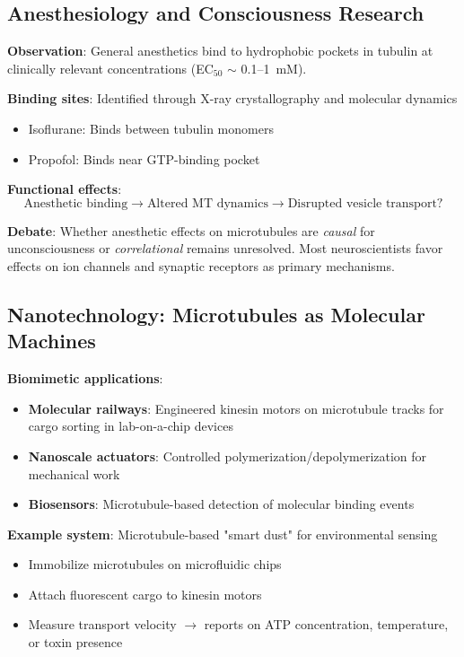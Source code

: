 \subsection{Anesthesiology and Consciousness Research}
\label{subsec:anesthesia}

\textbf{Observation}: General anesthetics bind to hydrophobic pockets in tubulin at clinically relevant concentrations (EC$_{50}$ $\sim$ 0.1--1~mM).

\textbf{Binding sites}: Identified through X-ray crystallography and molecular dynamics
\begin{itemize}
\item Isoflurane: Binds between tubulin monomers
\item Propofol: Binds near GTP-binding pocket
\end{itemize}

\textbf{Functional effects}:
\begin{equation}
\text{Anesthetic binding} \rightarrow \text{Altered MT dynamics} \rightarrow \text{Disrupted vesicle transport?}
\label{eq:anesthetic-cascade}
\end{equation}

\begin{warningbox}
\textbf{Debate}: Whether anesthetic effects on microtubules are \textit{causal} for unconsciousness or \textit{correlational} remains unresolved. Most neuroscientists favor effects on ion channels and synaptic receptors as primary mechanisms.
\end{warningbox}

\subsection{Nanotechnology: Microtubules as Molecular Machines}
\label{subsec:nanotech}

\textbf{Biomimetic applications}:
\begin{itemize}
\item \textbf{Molecular railways}: Engineered kinesin motors on microtubule tracks for cargo sorting in lab-on-a-chip devices
\item \textbf{Nanoscale actuators}: Controlled polymerization/depolymerization for mechanical work
\item \textbf{Biosensors}: Microtubule-based detection of molecular binding events
\end{itemize}

\textbf{Example system}: Microtubule-based "smart dust" for environmental sensing
\begin{itemize}
\item Immobilize microtubules on microfluidic chips
\item Attach fluorescent cargo to kinesin motors
\item Measure transport velocity $\rightarrow$ reports on ATP concentration, temperature, or toxin presence
\end{itemize}

